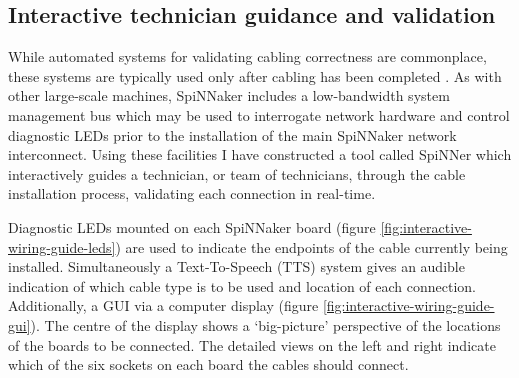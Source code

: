 		\subsection{Interactive technician guidance and validation}
			
			While automated systems for validating cabling correctness are
			commonplace, these systems are typically used only after cabling has been
			completed \cite{lakner07}. As with other large-scale machines, SpiNNaker
			includes a low-bandwidth system management bus which may be used to
			interrogate network hardware and control diagnostic LEDs prior to the
			installation of the main SpiNNaker network interconnect.  Using these
			facilities I have constructed a tool called SpiNNer which interactively
			guides a technician, or team of technicians, through the cable
			installation process, validating each connection in real-time.
			
			Diagnostic LEDs mounted on each SpiNNaker board (figure
			\ref{fig:interactive-wiring-guide-leds}) are used to indicate the
			endpoints of the cable currently being installed. Simultaneously a
			Text-To-Speech (TTS) system gives an audible indication of which cable
			type is to be used and location of each connection.  Additionally, a GUI
			via a computer display (figure \ref{fig:interactive-wiring-guide-gui}).
			The centre of the display shows a `big-picture' perspective of the
			locations of the boards to be connected. The detailed views on the left
			and right indicate which of the six sockets on each board the cables
			should connect.
			

